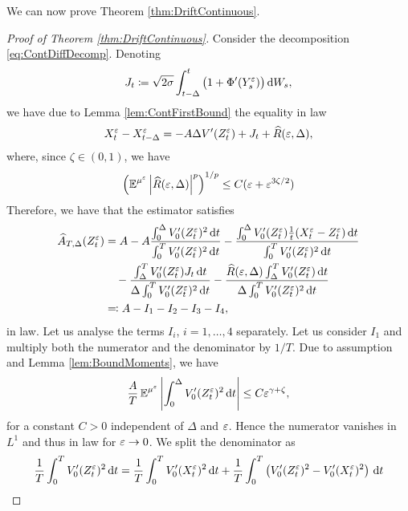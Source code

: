 \documentclass[10pt]{article}
\begin{document}
We can now prove Theorem \ref{thm:DriftContinuous}.
\begin{proof}[Proof of Theorem \ref{thm:DriftContinuous}] Consider the decomposition \eqref{eq:ContDiffDecomp}. Denoting
	\begin{equation}
		J_t \coloneqq \sqrt{2\sigma}\int_{t-\Delta}^t \big(1 + \Phi'(Y^\varepsilon_s)\big) \,\mathrm{d} W_s,
	\end{equation}
	we have due to Lemma \ref{lem:ContFirstBound} the equality in law
	\begin{equation}
		X^\varepsilon_t - X^\varepsilon_{t-\Delta} = -A\Delta V'(Z^\varepsilon_t) + J_t + \widehat R(\varepsilon, \Delta),
	\end{equation}
	where, since $\zeta \in (0, 1)$, we have
	\begin{equation}
		\left(\operatorname{\mathbb{E}}^{\mu^\varepsilon} \left\lvert\widehat R(\varepsilon, \Delta)\right\rvert^p\right)^{1/p} \leq C(\varepsilon + \varepsilon^{3\zeta/2})
	\end{equation}
	Therefore, we have that the estimator satisfies
	\begin{equation}\label{eq:EstDecomp}
	\begin{aligned}
		\widehat A_{T, \Delta}(Z_t^\varepsilon) &= A - A\frac{\int_0^\Delta V_0'(Z^\varepsilon_t)^2 \,\mathrm{d} t}{\int_0^T V_0'(Z^\varepsilon_t)^2 \,\mathrm{d} t} -\frac{\int_0^\Delta V_0'(Z^\varepsilon_t) \frac1t (X^\varepsilon_t - Z^\varepsilon_t) \,\mathrm{d} t}{\int_0^T V_0'(Z^\varepsilon_t)^2 \,\mathrm{d} t} \\
		&\quad - \frac{\int_\Delta^T V_0'(Z^\varepsilon_t) J_t \,\mathrm{d} t}{\Delta \int_0^T V_0'(Z^\varepsilon_t)^2 \,\mathrm{d} t} - \frac{\widehat R(\varepsilon, \Delta)\int_\Delta^T V_0'(Z^\varepsilon_t) \,\mathrm{d} t}{\Delta \int_0^T V_0'(Z^\varepsilon_t)^2 \,\mathrm{d} t} \\
		&\eqqcolon A - I_1 - I_2 - I_3 - I_4,
	\end{aligned}
	\end{equation}
	in law. Let us analyse the terms $I_i$, $i = 1, \ldots, 4$ separately. Let us consider $I_1$ and multiply both the numerator and the denominator by $1/T$. Due to assumption  and Lemma \ref{lem:BoundMoments}, we have
	\begin{equation}
		\frac{A}{T}\operatorname{\mathbb{E}}^{\mu^\varepsilon}\left\lvert\int_0^\Delta V_0'(Z^\varepsilon_t)^2 \,\mathrm{d} t\right\rvert \leq C \varepsilon^{\gamma + \zeta},
	\end{equation}
	for a constant $C > 0$ independent of $\Delta$ and $\varepsilon$. Hence the numerator vanishes in $L^1$ and thus in law for $\varepsilon \to 0$. We split the denominator as
	\begin{equation}
		\frac1T \int_0^T V_0'(Z^\epl_t)^2 \dd t = \frac1T\int_0^T V_0'(X^\epl_t)^2 \dd t + \frac1T\int_0^T \left(V_0'(Z^\epl_t)^2 - V_0'(X^\epl_t)^2 \right) \dd t 

\end{equation}
\end{proof}
\end{document}
